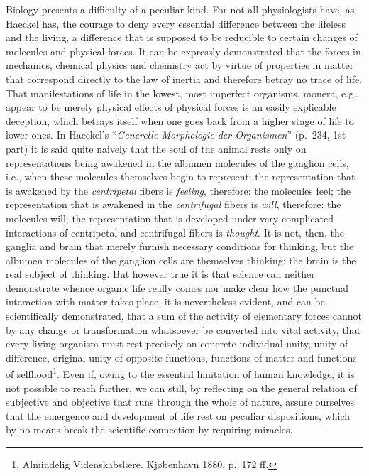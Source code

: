 \documentclass[12pt,a4paper]{article}
\newcommand{\opage}[1]{\marginnote{\footnotesize\textit{[#1]}}}
\begin{document}
Biology presents a difficulty of a peculiar kind. For not all
physiologists have, as Haeckel has, the courage to deny every
essential difference between the lifeless and the living, a
difference that is supposed to be reducible to certain changes of
molecules and physical forces. It can be expressly demonstrated that
the forces in mechanics, chemical physics and chemistry act
\opage{40}by virtue of properties in matter that correspond directly
to the law of inertia and therefore betray no trace of life. That
manifestations of life in the lowest, most imperfect organisms,
monera, e.g., appear to be merely physical effects of physical forces
is an easily explicable deception, which betrays itself when one goes
back from a higher stage of life to lower ones. In Haeckel's
``\textit{Generelle Morphologie der Organismen}'' (p.\ 234, 1st part)
it is said quite naively that the soul of the animal rests only on
representations being awakened in the albumen molecules of the
ganglion cells, i.e., when these molecules themselves begin to
represent; the representation that is awakened by the
\emph{centripetal} fibers is \emph{feeling}, therefore: the molecules
feel; the representation that is awakened in the \emph{centrifugal}
fibers is \emph{will}, therefore: the molecules will; the
representation that is developed under very complicated interactions
of centripetal and centrifugal fibers is \emph{thought}. It is not,
then, the ganglia and brain that merely furnish necessary conditions
for thinking, but the albumen molecules of the ganglion cells are
themselves thinking: the brain is the real subject of thinking. But
however true it is that science can neither demonstrate whence
organic life really comes nor make clear how the punctual interaction
with matter takes place, it is nevertheless evident, and can be
scientifically demonstrated, that a sum of the activity of elementary
forces cannot by any change or transformation whatsoever be converted
into vital activity, that every living organism must rest precisely on
concrete individual unity, unity of difference, original unity of
opposite functions, functions of matter and functions of
selfhood\footnote{Almindelig Videnskabslære. Kjøbenhavn 1880. p.\ 172 ff.}. %
Even if, owing to the essential limitation of human knowledge, it is
not possible to reach further, we can still, by reflecting on the
general relation of subjective and objective that runs through the
whole of nature, assure ourselves that the emergence and development
of life rest on peculiar dispositions, which by no means break the
scientific connection by requiring miracles.
\end{document}
